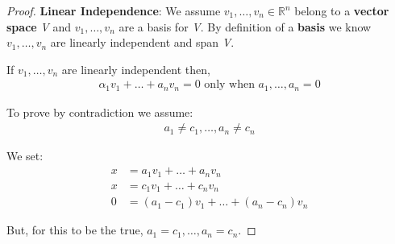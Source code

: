 \documentclass[12pt]{article}
\begin{document}
\begin{proof}
\textbf{Linear Independence}: We assume \(v_1,\dots, v_n \in \mathbb{R}^n\) belong to a \textbf{vector space} \emph{V} and \(v_1,\dots, v_n\) are a \textbf{}basis for \emph{V}. By definition of a \textbf{basis} we know \(v_1,\dots, v_n\) are linearly independent and span \emph{V}.

\noindent
If \(v_1,\dots, v_n\) are linearly independent then,
\begin{equation}
\begin{split}
\alpha_1 v_1 + \dots + a_n v_n = 0 \textrm{ only when } a_1,\dots,a_n = 0
\end{split}
\end{equation}

\noindent
To prove by contradiction we assume:
\begin{equation}
\begin{split}
a_1 \neq c_1,\dots, a_n \neq c_n
\end{split}
\end{equation}

\noindent
We set:
\begin{equation}
\begin{split}
x&=a_1 v_1 + \dots + a_n v_n \\
x&=c_1 v_1 + \dots + c_n v_n \\
0&=(a_1-c_1)v_1 + \dots + (a_n-c_n)v_n
\end{split}
\end{equation}

\noindent
But, for this to be the true, \(a_1 = c_1,\dots, a_n = c_n\).
\end{proof}

\end{document}

